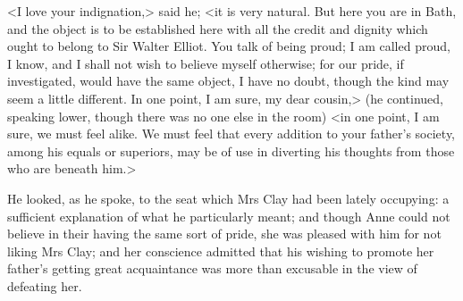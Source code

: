 <I love your indignation,> said he; <it is very natural. But here you are in Bath, and the object is to be established here with all the credit and dignity which ought to belong to Sir Walter Elliot. You talk of being proud; I am called proud, I know, and I shall not wish to believe myself otherwise; for our pride, if investigated, would have the same object, I have no doubt, though the kind may seem a little different. In one point, I am sure, my dear cousin,> (he continued, speaking lower, though there was no one else in the room) <in one point, I am sure, we must feel alike. We must feel that every addition to your father's society, among his equals or superiors, may be of use in diverting his thoughts from those who are beneath him.>

He looked, as he spoke, to the seat which Mrs Clay had been lately occupying: a sufficient explanation of what he particularly meant; and though Anne could not believe in their having the same sort of pride, she was pleased with him for not liking Mrs Clay; and her conscience admitted that his wishing to promote her father's getting great acquaintance was more than excusable in the view of defeating her.
